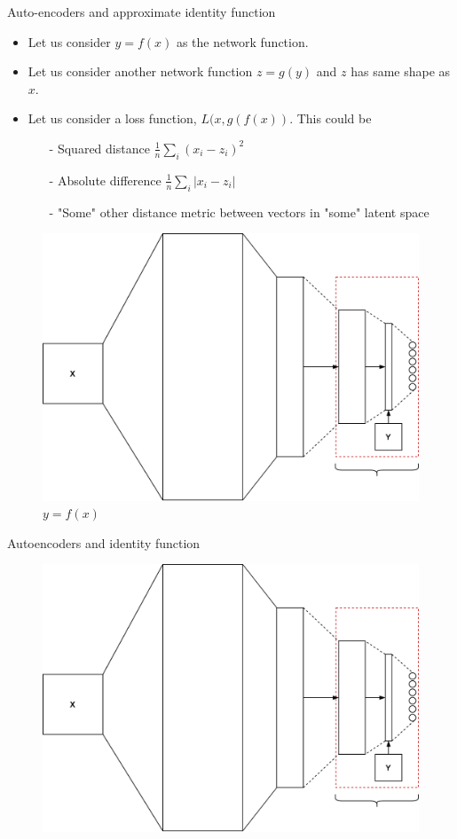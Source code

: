\begin{frame}{Auto-encoders and approximate identity function}
\begin{itemize}
	\item Let us consider $y=f(x)$ as the network function. 
	\item Let us consider another network function $z=g(y)$ and $z$ has same shape as $x$.
	\item Let us consider a loss function, $L(x,g(f(x))$. This could be 
	\begin{itemize}
		\item[-] Squared distance $\frac{1}{n}\sum\limits_{i}(x_i-z_i)^2  $
		\item[-] Absolute difference $\frac{1}{n}\sum\limits_{i}|x_i-z_i|$
		\item[-] "Some" other distance metric between vectors in "some" latent space 
	\end{itemize}  
\end{itemize}
	\begin{figure}
		\includegraphics[width=.2\textwidth]{figures/autoencoder_1}
		\caption*{\tiny{$y=f(x)$}}
	\end{figure}
\end{frame}
\begin{frame}{Autoencoders and identity function} 
	\begin{center}
		\begin{figure}
			\includegraphics[width=.8\textwidth]{figures/autoencoder_1}
		\end{figure}
	\end{center}
\end{frame}
